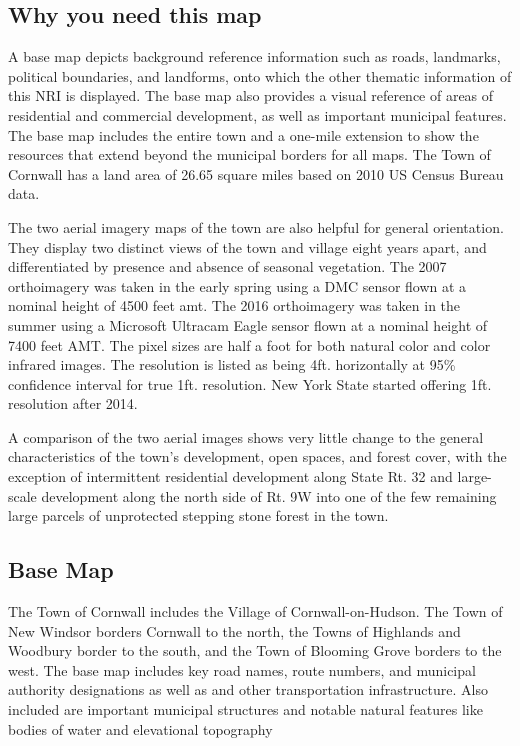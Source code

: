 \subsection*{Why you need this map}
A base map depicts background reference information such as roads, landmarks, 
political boundaries, and landforms, onto which the other thematic information 
of this NRI is displayed. The base map also provides a visual reference of 
areas of residential and commercial development, as well as important municipal 
features. The base map includes the entire town and a one-mile extension to 
show the resources that extend beyond the municipal borders for all maps. The 
Town of Cornwall has a land area of 26.65 square miles based on 2010 US Census 
Bureau data. 
\par
The two aerial imagery maps of the town are also helpful for general 
orientation. They display two distinct views of the town and village eight 
years apart, and differentiated by presence and absence of seasonal vegetation. 
The 2007 orthoimagery was taken in the early spring using a DMC sensor flown at 
a nominal height of 4500 feet \gls{amt}. The 2016 orthoimagery was taken in the 
summer using a Microsoft Ultracam Eagle sensor flown at a nominal height of 
7400 feet AMT. The pixel sizes are half a foot for both natural color and color 
infrared images. The resolution is listed as being 4ft. horizontally at 95\% 
confidence interval for true 1ft. resolution. New York State started offering 
1ft. resolution after 2014.
\par
A comparison of the two aerial images shows very little change to the general 
characteristics of the town’s development, open spaces, and forest cover, with 
the exception of intermittent residential development along State Rt. 32 and 
large-scale development along the north side of Rt. 9W into one of the few 
remaining large parcels of unprotected stepping stone forest in the town. 

\subsection*{Base Map}\label{subsec:basemap}
The Town of Cornwall includes the Village of Cornwall-on-Hudson. The Town of 
New Windsor borders Cornwall to the north, the Towns of Highlands and Woodbury 
border to the south, and the Town of Blooming Grove borders to the west. The 
base map includes key road names, route numbers, and municipal authority 
designations as well as and other transportation infrastructure. Also included 
are important municipal structures and notable natural features like bodies of 
water and elevational topography

